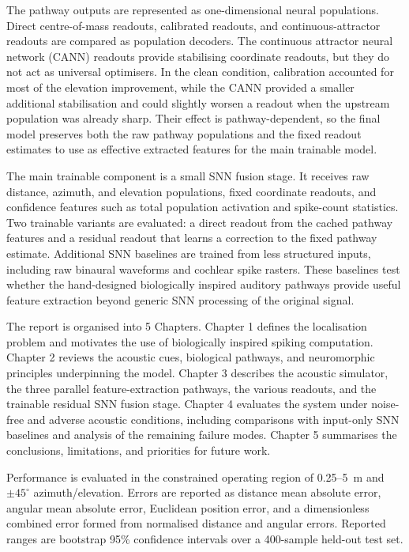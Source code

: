 The pathway outputs are represented as one-dimensional neural populations. Direct centre-of-mass readouts, calibrated readouts, and continuous-attractor readouts are compared as population decoders. The continuous attractor neural network (CANN) readouts provide stabilising coordinate readouts, but they do not act as universal optimisers. In the clean condition, calibration accounted for most of the elevation improvement, while the CANN provided a smaller additional stabilisation and could slightly worsen a readout when the upstream population was already sharp. Their effect is pathway-dependent, so the final model preserves both the raw pathway populations and the fixed readout estimates to use as effective extracted features for the main trainable model.

The main trainable component is a small SNN fusion stage. It receives raw distance, azimuth, and elevation populations, fixed coordinate readouts, and confidence features such as total population activation and spike-count statistics. Two trainable variants are evaluated: a direct readout from the cached pathway features and a residual readout that learns a correction to the fixed pathway estimate. Additional SNN baselines are trained from less structured inputs, including raw binaural waveforms and cochlear spike rasters. These baselines test whether the hand-designed biologically inspired auditory pathways provide useful feature extraction beyond generic SNN processing of the original signal.

The report is organised into 5 Chapters. Chapter 1 defines the localisation problem and motivates the use of biologically inspired spiking computation. Chapter 2 reviews the acoustic cues, biological pathways, and neuromorphic principles underpinning the model. Chapter 3 describes the acoustic simulator, the three parallel feature-extraction pathways, the various readouts, and the trainable residual SNN fusion stage. Chapter 4 evaluates the system under noise-free and adverse acoustic conditions, including comparisons with input-only SNN baselines and analysis of the remaining failure modes. Chapter 5 summarises the conclusions, limitations, and priorities for future work.

Performance is evaluated in the constrained operating region of 0.25--5~m and $\pm45^\circ$ azimuth/elevation. Errors are reported as distance mean absolute error, angular mean absolute error, Euclidean position error, and a dimensionless combined error formed from normalised distance and angular errors. Reported ranges are bootstrap 95\% confidence intervals over a 400-sample held-out test set.

